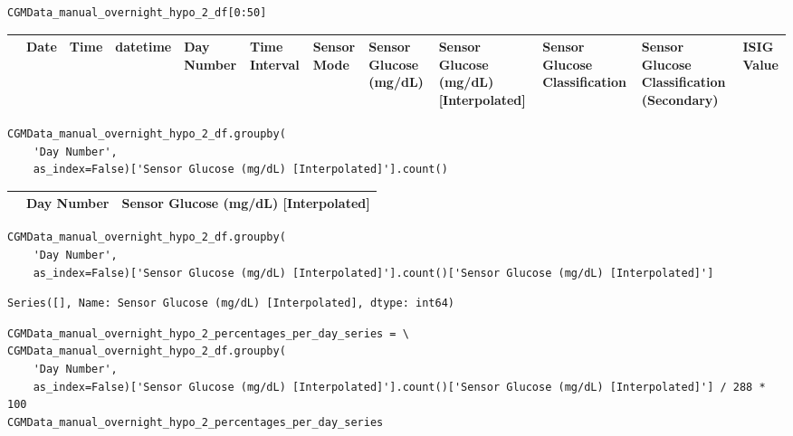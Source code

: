 \bigskip

\begin{verbatim}
CGMData_manual_overnight_hypo_2_df[0:50]
\end{verbatim}

\bigskip\noindent
\begin{tabular}{p{}p{}p{}p{}p{}p{}p{}p{}p{}p{}p{}p{}}
\toprule
 & Date & Time & datetime & Day Number & Time Interval & Sensor Mode & Sensor Glucose (mg/dL) & Sensor Glucose (mg/dL) [Interpolated] & Sensor Glucose Classification & Sensor Glucose Classification (Secondary) & ISIG Value \\
\hline
\bottomrule
\end{tabular}

\bigskip

\begin{verbatim}
CGMData_manual_overnight_hypo_2_df.groupby(
    'Day Number', 
    as_index=False)['Sensor Glucose (mg/dL) [Interpolated]'].count()
\end{verbatim}

\bigskip\noindent
\begin{tabular}{p{}p{}p{}}
\toprule
 & Day Number & Sensor Glucose (mg/dL) [Interpolated] \\
\hline
\bottomrule
\end{tabular}

\bigskip

\begin{verbatim}
CGMData_manual_overnight_hypo_2_df.groupby(
    'Day Number',
    as_index=False)['Sensor Glucose (mg/dL) [Interpolated]'].count()['Sensor Glucose (mg/dL) [Interpolated]']
\end{verbatim}

\begin{verbatim}
Series([], Name: Sensor Glucose (mg/dL) [Interpolated], dtype: int64)
\end{verbatim}

\begin{verbatim}
CGMData_manual_overnight_hypo_2_percentages_per_day_series = \
CGMData_manual_overnight_hypo_2_df.groupby(
    'Day Number', 
    as_index=False)['Sensor Glucose (mg/dL) [Interpolated]'].count()['Sensor Glucose (mg/dL) [Interpolated]'] / 288 * 100
CGMData_manual_overnight_hypo_2_percentages_per_day_series
\end{verbatim}

